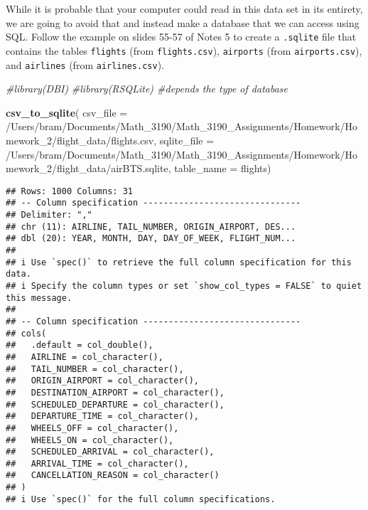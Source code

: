 \documentclass[
]{article}
\newenvironment{Shaded}{\begin{snugshade}}{\end{snugshade}}
\newcommand{\AttributeTok}[1]{\textcolor[rgb]{0.13,0.29,0.53}{#1}}
\newcommand{\CommentTok}[1]{\textcolor[rgb]{0.56,0.35,0.01}{\textit{#1}}}
\newcommand{\FunctionTok}[1]{\textcolor[rgb]{0.13,0.29,0.53}{\textbf{#1}}}
\newcommand{\NormalTok}[1]{#1}
\newcommand{\StringTok}[1]{\textcolor[rgb]{0.31,0.60,0.02}{#1}}
\begin{document}
While it is probable that your computer could read in this data set in
its entirety, we are going to avoid that and instead make a database
that we can access using SQL. Follow the example on slides 55-57 of
Notes 5 to create a \texttt{.sqlite} file that contains the tables
\texttt{flights} (from \texttt{flights.csv}), \texttt{airports} (from
\texttt{airports.csv}), and \texttt{airlines} (from
\texttt{airlines.csv}).

\begin{Shaded}
\begin{Highlighting}[]
\CommentTok{\#library(DBI)}
\CommentTok{\#library(RSQLite) \#depends the type of database}


\FunctionTok{csv\_to\_sqlite}\NormalTok{( }\AttributeTok{csv\_file =} \StringTok{\textquotesingle{}/Users/bram/Documents/Math\_3190/Math\_3190\_Assignments/Homework/Homework\_2/flight\_data/flights.csv\textquotesingle{}}\NormalTok{,}
               \AttributeTok{sqlite\_file =} \StringTok{\textquotesingle{}/Users/bram/Documents/Math\_3190/Math\_3190\_Assignments/Homework/Homework\_2/flight\_data/airBTS.sqlite\textquotesingle{}}\NormalTok{,}
               \AttributeTok{table\_name =} \StringTok{\textquotesingle{}flights\textquotesingle{}}\NormalTok{)}
\end{Highlighting}
\end{Shaded}

\begin{verbatim}
## Rows: 1000 Columns: 31
## -- Column specification -------------------------------
## Delimiter: ","
## chr (11): AIRLINE, TAIL_NUMBER, ORIGIN_AIRPORT, DES...
## dbl (20): YEAR, MONTH, DAY, DAY_OF_WEEK, FLIGHT_NUM...
## 
## i Use `spec()` to retrieve the full column specification for this data.
## i Specify the column types or set `show_col_types = FALSE` to quiet this message.
## 
## -- Column specification -------------------------------
## cols(
##   .default = col_double(),
##   AIRLINE = col_character(),
##   TAIL_NUMBER = col_character(),
##   ORIGIN_AIRPORT = col_character(),
##   DESTINATION_AIRPORT = col_character(),
##   SCHEDULED_DEPARTURE = col_character(),
##   DEPARTURE_TIME = col_character(),
##   WHEELS_OFF = col_character(),
##   WHEELS_ON = col_character(),
##   SCHEDULED_ARRIVAL = col_character(),
##   ARRIVAL_TIME = col_character(),
##   CANCELLATION_REASON = col_character()
## )
## i Use `spec()` for the full column specifications.
\end{verbatim}
\end{document}
